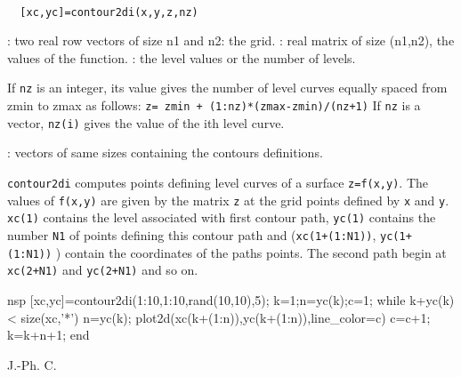 
\begin{mandesc}
  \\
\end{mandesc}
\begin{calling_sequence}
\begin{verbatim}
  [xc,yc]=contour2di(x,y,z,nz)
\end{verbatim}
\end{calling_sequence}

\begin{parameters}
  \begin{varlist}
    : two real row vectors of size n1 and n2: the grid.
    : real matrix of size (n1,n2), the values of the function.
    : the level values or the number of levels.
    \begin{varlist}
      \vname{-}If \verb!nz! is an integer, its value gives the number of
      level curves  equally spaced from zmin to zmax as follows:
      \verb!z= zmin + (1:nz)*(zmax-zmin)/(nz+1)!
      \vname{-} If \verb!nz! is a vector, \verb!nz(i)! gives the value of the ith level curve.
    \end{varlist}
    : vectors of same sizes containing the contours definitions.
  \end{varlist}
\end{parameters}

\begin{mandescription}
  \verb!contour2di! computes points defining level curves of a surface \verb!z=f(x,y)!.
  The values of \verb!f(x,y)! are given by the matrix \verb!z! at the grid points
  defined by \verb!x! and \verb!y!.
  \verb!xc(1)! contains the level associated with first contour path,
  \verb!yc(1)! contains the number \verb!N1! of points defining this contour path
  and (\verb!xc(1+(1:N1))!, \verb!yc(1+(1:N1))! ) contain the coordinates
  of the paths points.
  The second path begin at \verb!xc(2+N1)! and \verb!yc(2+N1)! and so on.
\end{mandescription}

\begin{examples}
  \begin{mintednsp}{nsp}
    [xc,yc]=contour2di(1:10,1:10,rand(10,10),5);
    k=1;n=yc(k);c=1;
    while k+yc(k) < size(xc,'*')
    n=yc(k);
    plot2d(xc(k+(1:n)),yc(k+(1:n)),line_color=c)
    c=c+1;
    k=k+n+1;
    end
  \end{mintednsp}
\end{examples}

\begin{manseealso}
\end{manseealso}
\begin{authors}
  J.-Ph. C.
\end{authors}
